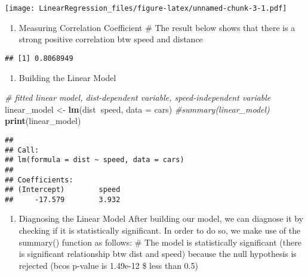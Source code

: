 \documentclass[
]{article}
\newenvironment{Shaded}{\begin{snugshade}}{\end{snugshade}}
\newcommand{\CommentTok}[1]{\textcolor[rgb]{0.56,0.35,0.01}{\textit{#1}}}
\newcommand{\DataTypeTok}[1]{\textcolor[rgb]{0.13,0.29,0.53}{#1}}
\newcommand{\KeywordTok}[1]{\textcolor[rgb]{0.13,0.29,0.53}{\textbf{#1}}}
\newcommand{\NormalTok}[1]{#1}
\newcommand{\OperatorTok}[1]{\textcolor[rgb]{0.81,0.36,0.00}{\textbf{#1}}}
\newcommand{\StringTok}[1]{\textcolor[rgb]{0.31,0.60,0.02}{#1}}
\providecommand{\tightlist}{%
  \setlength{\itemsep}{0pt}\setlength{\parskip}{0pt}}
\begin{document}
\texttt{[image: LinearRegression\_files/figure-latex/unnamed-chunk-3-1.pdf]}

\begin{enumerate}
\def\labelenumi{\arabic{enumi}.}
\setcounter{enumi}{2}
\tightlist
\item
  Measuring Correlation Coefficient \# The result below shows that there
  is a strong positive correlation btw speed and distance
\end{enumerate}

\begin{Shaded}
\end{Shaded}

\begin{verbatim}
## [1] 0.8068949
\end{verbatim}

\begin{enumerate}
\def\labelenumi{\arabic{enumi}.}
\setcounter{enumi}{3}
\tightlist
\item
  Building the Linear Model
\end{enumerate}

\begin{Shaded}
\begin{Highlighting}[]
\CommentTok{# fitted linear model, dist-dependent variable, speed-independent variable}
\NormalTok{linear_model <-}\StringTok{ }\KeywordTok{lm}\NormalTok{(dist}\OperatorTok{~}\NormalTok{speed, }\DataTypeTok{data =}\NormalTok{ cars)}
\CommentTok{#summary(linear_model)}
\KeywordTok{print}\NormalTok{(linear_model)}
\end{Highlighting}
\end{Shaded}

\begin{verbatim}
## 
## Call:
## lm(formula = dist ~ speed, data = cars)
## 
## Coefficients:
## (Intercept)        speed  
##     -17.579        3.932
\end{verbatim}

\begin{enumerate}
\def\labelenumi{\arabic{enumi}.}
\setcounter{enumi}{4}
\tightlist
\item
  Diagnosing the Linear Model After building our model, we can diagnose
  it by checking if it is statistically significant. In order to do so,
  we make use of the summary() function as follows: \# The model is
  statistically significant (there is significant relationship btw dist
  and speed) because the null hypothesis is rejected (bcos p-value is
  1.49e-12 \$ less than 0.5)
\end{enumerate}
\end{document}

